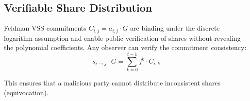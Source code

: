 \subsection{Verifiable Share Distribution}

Feldman VSS commitments $C_{i,j} = a_{i,j} \cdot G$ are binding under the discrete
logarithm assumption and enable public verification of shares without revealing the
polynomial coefficients. Any observer can verify the commitment consistency:
\[
  s_{i \to j} \cdot G = \sum_{k=0}^{t-1} j^k \cdot C_{i,k}
\]

This ensures that a malicious party cannot distribute inconsistent shares (equivocation).

